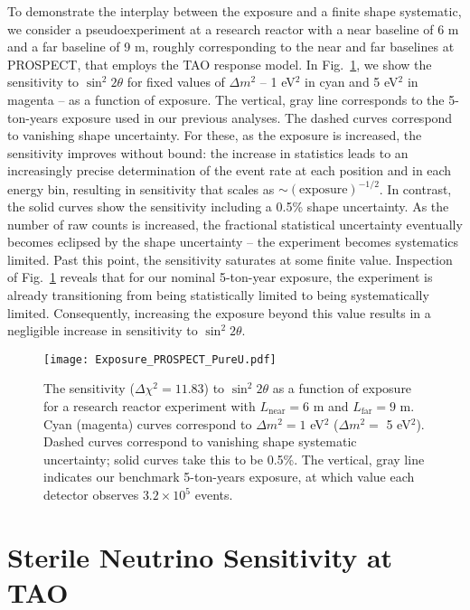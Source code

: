 \documentclass[prd, twocolumn, tightenlines, twoside, secnumarabic, superscriptaddress, preprintnumbers, nofootinbib, notitlepage]{revtex4-1}
\begin{document}
To demonstrate the interplay between the exposure and a finite shape systematic, we consider a pseudoexperiment at a research reactor with a near baseline of 6 m and a far baseline of 9 m, roughly corresponding to the near and far baselines at PROSPECT, that employs the TAO response model. In Fig.~\ref{fig:exposureU}, we show the sensitivity to $\sin^2 2\theta$ for fixed values of $\Delta m^2$ -- 1 eV$^2$ in cyan and 5 eV$^2$ in magenta -- as a function of exposure. The vertical, gray line corresponds to the 5-ton-years exposure used in our previous analyses. The dashed curves correspond to vanishing shape uncertainty. For these, as the exposure is increased, the sensitivity improves without bound: the increase in statistics leads to an increasingly precise determination of the event rate at each position and in each energy bin, resulting in sensitivity that scales as $\sim \left(\text{exposure}\right)^{-1/2}$. In contrast, the solid curves show the sensitivity including a 0.5\% shape uncertainty. As the number of raw counts is increased, the fractional statistical uncertainty eventually becomes eclipsed by the shape uncertainty -- the experiment becomes systematics limited. Past this point, the sensitivity saturates at some finite value. Inspection of Fig.~\ref{fig:exposureU} reveals that for our nominal 5-ton-year exposure, the experiment is already transitioning from being statistically limited to being systematically limited. Consequently, increasing the exposure beyond this value results in a negligible increase in sensitivity to $\sin^2 2\theta$.

\begin{figure}[t!]
    \texttt{[image: Exposure\_PROSPECT\_PureU.pdf]}
    \caption{The sensitivity ($\Delta \chi^2 = 11.83$) to $\sin^2 2\theta$ as a function of exposure for a research reactor experiment with $L_\text{near} = 6$ m and $L_\text{far} = 9$ m. Cyan (magenta) curves correspond to $\Delta m^2 = 1$ eV$^2$ ($\Delta m^2 = $ 5 eV$^2$). Dashed curves correspond to vanishing shape systematic uncertainty; solid curves take this to be 0.5\%. The vertical, gray line indicates our benchmark 5-ton-years exposure, at which value each detector observes $3.2\times10^{5}$ events.}
    \label{fig:exposureU}
\end{figure}

\section{Sterile Neutrino Sensitivity at TAO}
\label{sec:tao}
\setcounter{equation}{0}
\end{document}
